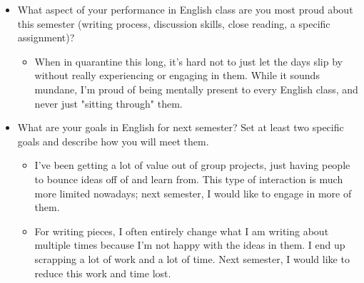 \documentclass[letterpaper]{article}
\begin{document}
\begin{itemize}
\item What aspect of your performance in English class are you most proud
about this semester (writing process, discussion skills, close
reading, a specific assignment)?

\begin{itemize}
\item When in quarantine this long, it's hard not to just let the days
slip by without really experiencing or engaging in them. While it
sounds mundane, I'm proud of being mentally present to every English
class, and never just "sitting through" them.
\end{itemize}

\item What are your goals in English for next semester? Set at least two
specific goals and describe how you will meet them.

\begin{itemize}
\item I've been getting a lot of value out of group projects, just having
people to bounce ideas off of and learn from. This type of
interaction is much more limited nowadays; next semester, I would
like to engage in more of them.
\item For writing pieces, I often entirely change what I am writing about
multiple times because I'm not happy with the ideas in them. I end
up scrapping a lot of work and a lot of time. Next semester, I would
like to reduce this work and time lost.
\end{itemize}
\end{itemize}
\end{document}
